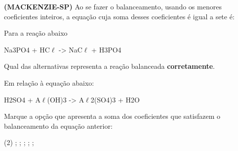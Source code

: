 \documentclass[9 pt]{scrartcl}
\def\PQ{0.84} %
\begin{document}
\begin{exercise}[points=\PQ]
\textbf{(MACKENZIE-SP)} Ao se fazer o balanceamento, usando os menores coeficientes inteiros, a
equação cuja soma desses coeficientes é igual a sete é:
\begin{choice}
\choice {}
\choice {}
\choice {}
\choice {}
\choice {}
\end{choice}
\end{exercise}




\begin{exercise}[points=\PQ]
Para a reação abaixo


\begin{reaction*}
 Na3PO4 +  HC$\ell$ -> NaC$\ell$ + H3PO4
\end{reaction*}

Qual das alternativas representa a reação balanceada \textbf{corretamente}.


\begin{choice}
\choice {}
\choice {}
\choice {}
\choice {}
\choice {}
\end{choice}
\end{exercise}




\begin{exercise}[points=\PQ]
Em relação à equação abaixo:
\begin{reaction*}
H2SO4 + A\(\ell\)(OH)3 -> A\(\ell\)2(SO4)3 + H2O
\end{reaction*}
Marque a opção que apresenta a soma dos coeficientes que satisfazem o balanceamento da equação anterior:
\begin{choice}(2)
;
;
;
;
;
\end{choice}
\end{exercise}
\end{document}
